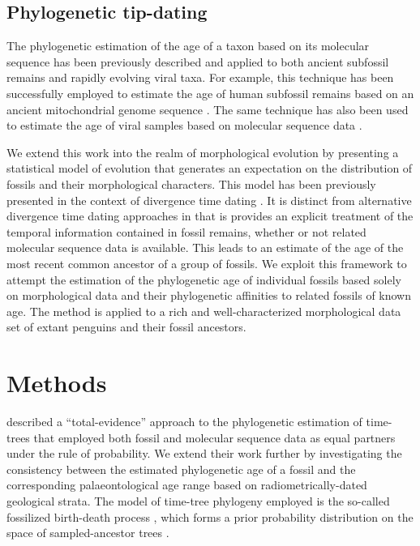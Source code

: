 \documentclass[11pt]{article}
\begin{document}
\subsection*{Phylogenetic tip-dating}

The phylogenetic estimation of the age of a taxon based on its molecular sequence has been previously described \autocite{drummond2002computational,shapiro2011bayesian} and applied to both ancient subfossil remains and rapidly evolving viral taxa. For example, this technique has been successfully employed to estimate the age of human subfossil remains based on an ancient mitochondrial genome sequence \autocite{meyer2014mitochondrial}. The same technique has also been used to estimate the age of viral samples based on molecular sequence data \autocite[e.g.][]{gray2013evolutionary}.

We extend this work into the realm of morphological evolution by presenting a statistical model of evolution that generates an expectation on the distribution of fossils and their morphological characters. This model has been previously presented in the context of divergence time dating \autocite{gavr2014,gavryushkina2015bayesian}. It is distinct from alternative divergence time dating approaches in that is provides an explicit treatment of the temporal information contained in fossil remains, whether or not related molecular sequence data is available. This leads to an estimate of the age of the most recent common ancestor of a group of fossils. We exploit this framework to attempt the estimation of the phylogenetic age of individual fossils based solely on morphological data and their phylogenetic affinities to related fossils of known age. The method is applied to a rich and well-characterized morphological data set of extant penguins and their fossil ancestors.

\section*{Methods}

\textcite{gavryushkina2015bayesian} described a ``total-evidence'' approach to the phylogenetic estimation of time-trees that employed both fossil and molecular sequence data as equal partners under the rule of probability. We extend their work further by investigating the consistency between the estimated phylogenetic age of a fossil and the corresponding palaeontological age range based on radiometrically-dated geological strata. The model of time-tree phylogeny employed is the so-called fossilized birth-death process \autocite{Heath2014}, which forms a prior probability distribution on the space of sampled-ancestor trees \autocite{Gavr2013}.
\end{document}
